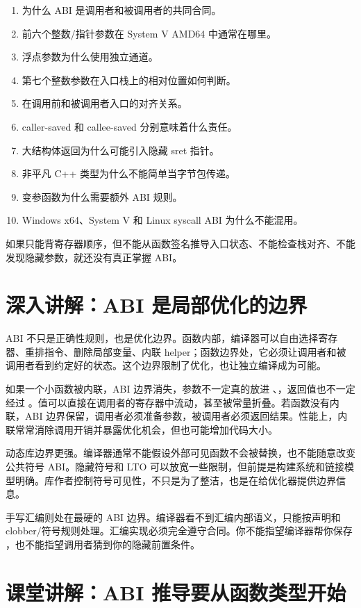 \begin{enumerate}
  \item 为什么 ABI 是调用者和被调用者的共同合同。
  \item 前六个整数/指针参数在 System V AMD64 中通常在哪里。
  \item 浮点参数为什么使用独立通道。
  \item 第七个整数参数在入口栈上的相对位置如何判断。
  \item {} 在调用前和被调用者入口的对齐关系。
  \item caller-saved 和 callee-saved 分别意味着什么责任。
  \item 大结构体返回为什么可能引入隐藏 sret 指针。
  \item 非平凡 C++ 类型为什么不能简单当字节包传递。
  \item 变参函数为什么需要额外 ABI 规则。
  \item Windows x64、System V 和 Linux syscall ABI 为什么不能混用。
\end{enumerate}

如果只能背寄存器顺序，但不能从函数签名推导入口状态、不能检查栈对齐、不能发现隐藏参数，就还没有真正掌握 ABI。

\section{深入讲解：ABI 是局部优化的边界}

ABI 不只是正确性规则，也是优化边界。函数内部，编译器可以自由选择寄存器、重排指令、删除局部变量、内联 helper；函数边界处，它必须让调用者和被调用者看到约定好的状态。这个边界限制了优化，也让独立编译成为可能。

如果一个小函数被内联，ABI 边界消失，参数不一定真的放进 、，返回值也不一定经过 。值可以直接在调用者的寄存器中流动，甚至被常量折叠。若函数没有内联，ABI 边界保留，调用者必须准备参数，被调用者必须返回结果。性能上，内联常常消除调用开销并暴露优化机会，但也可能增加代码大小。

动态库边界更强。编译器通常不能假设外部可见函数不会被替换，也不能随意改变公共符号 ABI。隐藏符号和 LTO 可以放宽一些限制，但前提是构建系统和链接模型明确。库作者控制符号可见性，不只是为了整洁，也是在给优化器提供边界信息。

手写汇编则处在最硬的 ABI 边界。编译器看不到汇编内部语义，只能按声明和 clobber/符号规则处理。汇编实现必须完全遵守合同。你不能指望编译器帮你保存 ，也不能指望调用者猜到你的隐藏前置条件。

\section{课堂讲解：ABI 推导要从函数类型开始}


